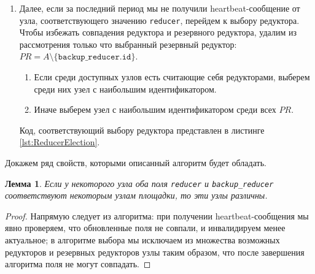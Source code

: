 \documentclass{article}
\theoremstyle{plain}
\theoremstyle{plain}
\theoremstyle{plain}
\newtheorem{lemma}{Лемма}[section]
\theoremstyle{plain}
\theoremstyle{definition}
\theoremstyle{remark}
\theoremstyle{plain}
\begin{document}
\begin{enumerate}
    \item Далее, если за последний период мы не получили heartbeat-сообщение от узла, соответствующего значению \texttt{reducer},  перейдем к выбору редуктора. Чтобы избежать совпадения редуктора и резервного редуктора, удалим из рассмотрения только что выбранный резервный редуктор: $PR = A \setminus \{ \texttt{backup\_reducer.id} \}$.

    \begin{enumerate}
        \item Если среди доступных узлов есть считающие себя редукторами, выберем среди них узел с наибольшим идентификатором.

        \item Иначе выберем узел с наибольшим идентификатором среди всех $PR$.
    \end{enumerate}
    
    Код, соответствующий выбору редуктора представлен в листинге \ref{lst:ReducerElection}.
    

\end{enumerate}

Докажем ряд свойств, которыми описанный алгоритм будет обладать.

\begin{lemma}
\label{ElectionSafety}
    Если у некоторого узла оба поля \texttt{reducer} и \texttt{backup\_reducer} соответствуют некоторым узлам площадки, то эти узлы различны.
\end{lemma}
\begin{proof}
    Напрямую следует из алгоритма: при получении heartbeat-сообщения мы явно проверяем, что обновленные поля не совпали, и инвалидируем менее актуальное; в алгоритме выбора мы исключаем из множества возможных редукторов и резервных редукторов узлы таким образом, что после завершения алгоритма поля не могут совпадать.
\end{proof}
\end{document}
